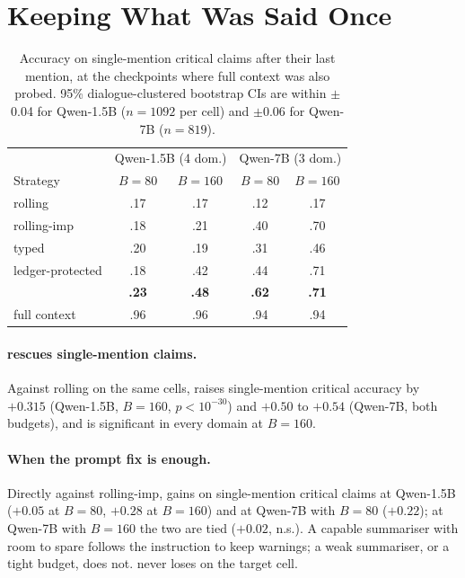 \section{Keeping What Was Said Once}
\label{sec:method-results}


\begin{table}[t]
\centering\small
\begin{tabular}{lcccc}
\toprule
 & \multicolumn{2}{c}{Qwen-1.5B (4 dom.)} & \multicolumn{2}{c}{Qwen-7B (3 dom.)} \\
Strategy & $B{=}80$ & $B{=}160$ & $B{=}80$ & $B{=}160$ \\
\midrule
rolling          & .17 & .17 & .12 & .17 \\
rolling-imp      & .18 & .21 & .40 & .70 \\
typed            & .20 & .19 & .31 & .46 \\
ledger-protected & .18 & .42 & .44 & .71 \\
\ledger{}        & \textbf{.23} & \textbf{.48} & \textbf{.62} & \textbf{.71} \\
\midrule
full context     & .96 & .96 & .94 & .94 \\
\bottomrule
\end{tabular}
\caption{Accuracy on single-mention critical claims after their last mention, at the checkpoints where full context was also probed. 95\% dialogue-clustered bootstrap CIs are within $\pm$0.04 for Qwen-1.5B ($n{=}1092$ per cell) and $\pm$0.06 for Qwen-7B ($n{=}819$).}
\label{tab:f1}
\end{table}

\paragraph{\ledger{} rescues single-mention claims.}
Against rolling on the same cells, \ledger{} raises single-mention critical accuracy by $+0.315$ (Qwen-1.5B, $B{=}160$, $p<10^{-30}$) and $+0.50$ to $+0.54$ (Qwen-7B, both budgets), and is significant in every domain at $B{=}160$.

\paragraph{When the prompt fix is enough.}
Directly against rolling-imp, \ledger{} gains on single-mention critical claims at Qwen-1.5B ($+0.05$ at $B{=}80$, $+0.28$ at $B{=}160$) and at Qwen-7B with $B{=}80$ ($+0.22$); at Qwen-7B with $B{=}160$ the two are tied ($+0.02$, n.s.).
A capable summariser with room to spare follows the instruction to keep warnings; a weak summariser, or a tight budget, does not.
\ledger{} never loses on the target cell.

